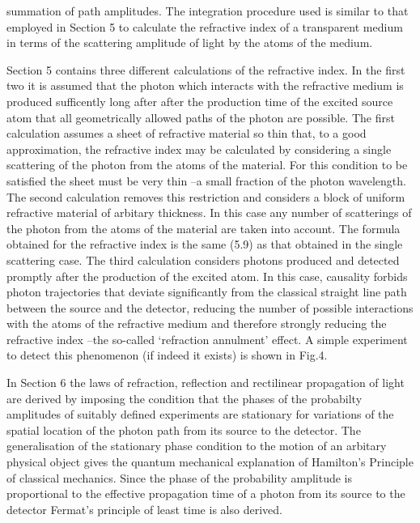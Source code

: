 \documentclass [12pt]{article}
\begin{document}
{    summation of path amplitudes. The integration procedure used is similar to that employed
   in Section 5 to calculate the refractive index of a transparent medium in terms of the
   scattering amplitude of light by the atoms of the medium.
   \par Section 5 contains three different calculations of the refractive index.
  In the first two it is assumed that the photon which interacts with the refractive medium
 is produced sufficently long after after the production time of the excited source atom
  that all geometrically allowed paths of the photon are possible. The first calculation 
  assumes a sheet of refractive material so thin that, to a good approximation, the refractive index
  may be calculated by considering a single scattering of the photon from the atoms 
  of the material. For this condition to be satisfied the sheet must be very thin --a small fraction
  of the photon wavelength. The second calculation removes this restriction and considers a block
  of uniform refractive material of arbitary thickness. In this case any number of scatterings of the photon from the
  atoms of the material are taken into account. The formula obtained for the refractive index is
  the same (5.9) as that obtained in the single scattering case. The third calculation
   considers photons produced and detected promptly after the production of the excited atom. In this case,
   causality  forbids photon trajectories that deviate significantly from the classical straight 
  line path between the source and the detector, reducing the number of possible interactions
   with the atoms of the refractive medium and therefore strongly reducing the refractive 
  index --the so-called `refraction annulment' effect. A simple experiment to detect this phenomenon
   (if indeed it exists) is shown in Fig.4.
   \par In Section 6 the laws of refraction, reflection and rectilinear propagation of light
  are derived by imposing the condition that the phases of the probabilty amplitudes of
   suitably defined experiments are stationary for variations of the spatial location 
   of the photon path from its source to the detector. The generalisation of the stationary
   phase condition to the motion of an arbitary physical object gives the quantum mechanical
   explanation of Hamilton's Principle of classical mechanics. Since the phase of the probability
   amplitude is proportional to the effective propagation time of a photon from its 
   source to the detector Fermat's principle of least time is also derived.
}
\end{document}
